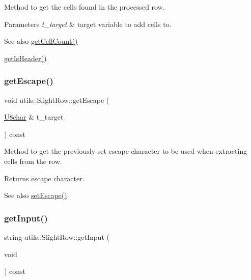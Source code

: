 Method to get the cells found in the processed row. 
\begin{DoxyParams}{Parameters}
{\em t\+\_\+target} & target variable to add cells to. \\
\hline
\end{DoxyParams}
\begin{DoxySeeAlso}{See also}
\hyperlink{classutils_1_1SlightRow_af7df52464ce8151d7c3c429d0a796c7f}{get\+Cell\+Count()} 

\hyperlink{classutils_1_1SlightRow_a702f97c32ea40303cd83a540404a6eca}{get\+Is\+Header()} 
\end{DoxySeeAlso}
\mbox{\label{classutils_1_1SlightRow_a246b904bb9d00b2fa85d491be12d95e2}} 
\subsubsection{\texorpdfstring{get\+Escape()}{getEscape()}}
{\footnotesize\ttfamily void utils\+::\+Slight\+Row\+::get\+Escape (\begin{DoxyParamCaption}\item[{\hyperlink{classutils_1_1U8char}{U8char} \&}]{t\+\_\+target }\end{DoxyParamCaption}) const}

Method to get the previously set escape character to be used when extracting cells from the row. \begin{DoxyReturn}{Returns}
escape character. 
\end{DoxyReturn}
\begin{DoxySeeAlso}{See also}
\hyperlink{classutils_1_1SlightRow_afab9a3c238d96208e1902da833845e1d}{set\+Escape()} 
\end{DoxySeeAlso}
\mbox{\label{classutils_1_1SlightRow_a8491ac21fba9e5c258e7c1a3bf3da26a}} 
\subsubsection{\texorpdfstring{get\+Input()}{getInput()}}
{\footnotesize\ttfamily string utils\+::\+Slight\+Row\+::get\+Input (\begin{DoxyParamCaption}\item[{void}]{ }\end{DoxyParamCaption}) const}

